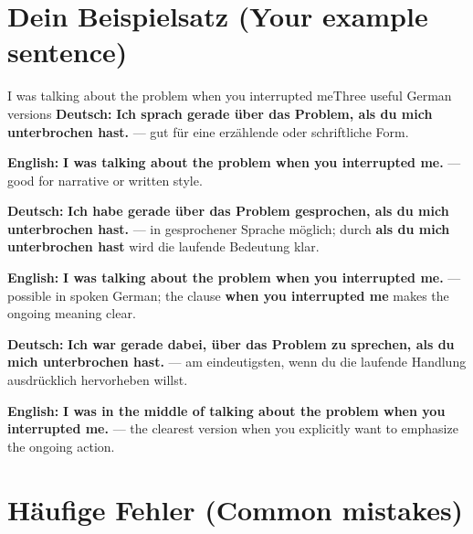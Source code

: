 \documentclass[a4paper,11pt]{article}
\newcommand{\GermanText}[1]{\textbf{Deutsch: }#1\par}
\newcommand{\EnglishText}[1]{{\small\color{SoftGray}\textbf{English: }#1\par}}
\begin{document}
    \section{Dein Beispielsatz \textnormal{(Your example sentence)}}

        \begin{grammarentry}{I was talking about the problem when you interrupted me}{Three useful German versions}
            \GermanText{\textbf{Ich sprach gerade über das Problem, als du mich unterbrochen hast.} --- gut für eine erzählende oder schriftliche Form.}
            \EnglishText{\textbf{I was talking about the problem when you interrupted me.} --- good for narrative or written style.}

            \GermanText{\textbf{Ich habe gerade über das Problem gesprochen, als du mich unterbrochen hast.} --- in gesprochener Sprache möglich; durch \textbf{als du mich unterbrochen hast} wird die laufende Bedeutung klar.}
            \EnglishText{\textbf{I was talking about the problem when you interrupted me.} --- possible in spoken German; the clause \textbf{when you interrupted me} makes the ongoing meaning clear.}

            \GermanText{\textbf{Ich war gerade dabei, über das Problem zu sprechen, als du mich unterbrochen hast.} --- am eindeutigsten, wenn du die laufende Handlung ausdrücklich hervorheben willst.}
            \EnglishText{\textbf{I was in the middle of talking about the problem when you interrupted me.} --- the clearest version when you explicitly want to emphasize the ongoing action.}
        \end{grammarentry}

    \section{Häufige Fehler \textnormal{(Common mistakes)}}
\end{document}
